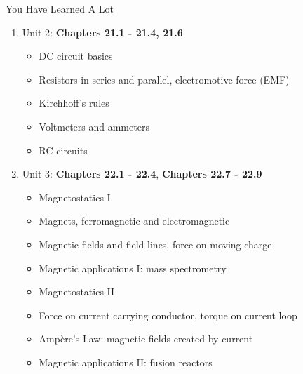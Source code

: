 \documentclass{beamer}
\begin{document}
\begin{frame}{You Have Learned A Lot}
\scriptsize
\begin{enumerate}
\scriptsize
\item Unit 2: \textbf{Chapters 21.1 - 21.4, 21.6}
\begin{itemize}
\scriptsize
\item DC circuit basics
\item Resistors in series and parallel, electromotive force (EMF)
\item Kirchhoff's rules
\item Voltmeters and ammeters
\item RC circuits
\end{itemize}
\scriptsize
\item Unit 3: \textbf{Chapters 22.1 - 22.4}, \textbf{Chapters 22.7 - 22.9}
\begin{itemize}
\scriptsize
\item Magnetostatics I
\item Magnets, ferromagnetic and electromagnetic
\item Magnetic fields and field lines, force on moving charge
\item Magnetic applications I: mass spectrometry
\item Magnetostatics II
\item Force on current carrying conductor, torque on current loop
\item Amp\`{e}re's Law: magnetic fields created by current
\item Magnetic applications II: fusion reactors
\end{itemize}
\end{enumerate}
\end{frame}
\end{document}
